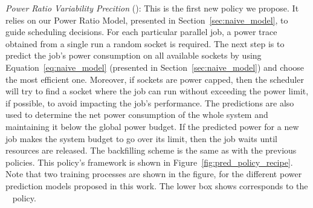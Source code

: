 \par
\textit{Power Ratio Variability Precition} (\PRVSSched):  This is the first new policy we propose. 
It relies on our Power Ratio Model, presented in Section~\ref{sec:naive_model}, to guide scheduling decisions.  
For each particular parallel job, a power trace obtained from a single run a random socket is required.
The next step is to predict the job's power consumption on all available sockets by using Equation~\ref{eq:naive_model} (presented in Section~\ref{sec:naive_model}) and choose the most efficient one.  
Moreover, if sockets are power capped, then the scheduler 
will try to find a socket where the job can run without exceeding the power limit, if possible, to avoid impacting the job's performance.
The predictions are also used to determine the net power consumption of the whole system and maintaining it below the global power budget. 
If the predicted power for a new job makes the system budget to go over its limit,
then the job waits until resources are released.  
The backfilling scheme is the same as with the previous policies. 
This policy's framework is shown in Figure~\ref{fig:pred_policy_recipe}.  
Note that two training processes are shown in the figure, for the different power 
prediction models proposed in this work.  The lower box shows corresponds to the \PRVSSched~ policy.

